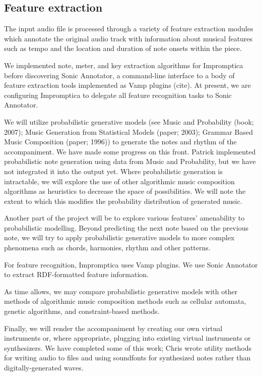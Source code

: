 \documentclass[11pt,conference,letterpaper]{IEEEtran}
\begin{document}
\subsection{Feature extraction}

The input audio file is processed through a variety of feature extraction modules which annotate the original audio track with information about musical features such as tempo and the location and duration of note onsets within the piece.

We implemented note, meter, and key extraction algorithms for Impromptica before discovering Sonic Annotator, a command-line interface to a body of feature extraction tools implemented as Vamp plugins (cite). At present, we are configuring Impromptica to delegate all feature recognition tasks to Sonic Annotator.

We will utilize probabilistic generative models (see Music and Probability (book; 2007); Music Generation from Statistical Models (paper; 2003); Grammar Based Music Composition (paper; 1996)) to generate the notes and rhythm of the accompaniment. We have made some progress on this front. Patrick implemented probabilistic note generation using data from Music and Probability, but we have not integrated it into the output yet. Where probabilistic generation is intractable, we will explore the use of other algorithmic music composition algorithms as heuristics to decrease the space of possibilities. We will note the extent to which this modifies the probability distribution of generated music.

Another part of the project will be to explore various features’ amenability to probabilistic modelling. Beyond predicting the next note based on the previous note, we will try to apply probabilistic generative models to more complex phenomena such as chords, harmonies, rhythm and other patterns.

For feature recognition, Impromptica uses Vamp plugins. We use Sonic Annotator to extract RDF-formatted feature information.

As time allows, we may compare probabilistic generative models with other methods of algorithmic music composition methods such as cellular automata, genetic algorithms, and constraint-based methods.

Finally, we will render the accompaniment by creating our own virtual instruments or, where appropriate, plugging into existing virtual instruments or synthesizers. We have completed some of this work; Chris wrote utility methods for writing audio to files and using soundfonts for synthesized notes  rather than digitally-generated waves.
\end{document}
